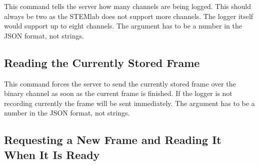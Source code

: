 This command tells the server how  many channels are being logged. This should
always be two as the STEMlab does not support more channels. The logger itself
would support up  to eight channels.  The  argument has to be a  number in the
JSON format, not strings.


\subsection{Reading the Currently Stored Frame} %
\label{subsec:devguide:server:currently_stored_frame}

This command  forces the server  to send the  currently stored frame  over the
binary channel as soon as the current  frame is finished. If the logger is not
recording currently the frame will be sent immediately.
The   argument  has to  be a  number in  the JSON  format, not
strings.


\subsection{Requesting a New Frame and Reading It When It Is Ready} %
\label{subsec:devguide:server:request_new_frame}

